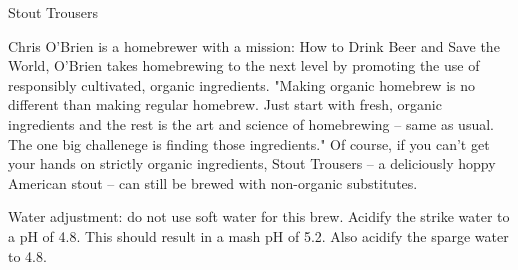 \begin{recipie}{Stout Trousers}

\begin{aboutblock}
Chris O'Brien is a homebrewer with a mission: How to Drink
Beer and Save the World, O'Brien takes homebrewing to the next level
by promoting the use of responsibly cultivated, organic ingredients.
"Making organic homebrew is no different than making regular homebrew.
Just start with fresh, organic ingredients and the rest is the art and
science of homebrewing -- same as usual. The one big challenege is finding those
ingredients." Of course, if you can't get your hands on strictly
organic ingredients, Stout Trousers -- a deliciously hoppy American
stout -- can still be brewed with non-organic substitutes.
\end{aboutblock}


\begin{methodandtiming}
 
\begin{mashsteps}
\end{mashsteps}

\begin{fermentationsteps}
\end{fermentationsteps}

\begin{directions}
Water adjustment: do not use soft water for this brew. Acidify the strike water
to a pH of 4.8. This should result in a mash pH of 5.2. Also acidify the sparge
water to 4.8.
\end{directions}

\end{methodandtiming}

\pagebreak

\begin{ingredientsblock}

\begin{malts}
\end{malts}

\begin{hops}
\end{hops}


\end{ingredientsblock}

\end{recipie}

